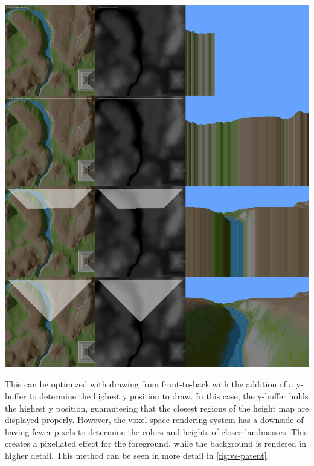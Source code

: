 \documentclass[10pt]{report}
\begin{document}
		\begin{minipage}{\textwidth}
			\centering
			\includegraphics[scale=.2]{line-by-line}
			\label{fig:vs-raster}
		\end{minipage}
	
		This can be optimized with drawing from front-to-back with the addition of a y-buffer to determine the highest y position to draw. In this case, the y-buffer holds the highest y position, guaranteeing that the closest regions of the height map are displayed properly. However, the voxel-space rendering system has a downside of having fewer pixels to determine the colors and heights of closer landmasses. This creates a pixellated effect for the foreground, while the background is rendered in higher detail. This method can be seen in more detail in \autoref{fig:vs-patent}. 
		 
\end{document}
